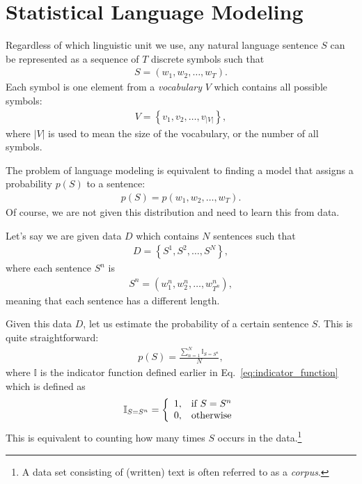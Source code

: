 \documentclass{report}
\newcommand{\II}[0]{\mathbb{I}}
\begin{document}
\section{Statistical Language Modeling}
\label{sec:lm}

Regardless of which linguistic unit we use, any natural language sentence $S$
can be represented as a sequence of $T$ discrete symbols such that
\begin{align*}
    S = (w_1, w_2, \ldots, w_T).
\end{align*}
Each symbol is one element from a {\em vocabulary} $V$ which contains all
possible symbols:
\begin{align*}
    V = \left\{ v_1, v_2, \ldots, v_{|V|}\right\},
\end{align*}
where $|V|$ is used to mean the size of the vocabulary, or the number of all
symbols.

The problem of language modeling is equivalent to finding a model that assigns a
probability $p(S)$ to a sentence:
\begin{align}
    \label{eq:sentence_prob}
    p(S) = p(w_1, w_2, \ldots, w_T).
\end{align}
Of course, we are not given this distribution and need to learn this from data.

Let's say we are given data $D$ which contains $N$ sentences such that
\begin{align*}
    D = \left\{ S^1, S^2, \ldots, S^N \right\},
\end{align*}
where each sentence $S^n$ is 
\begin{align*}
    S^n = (w_1^n, w_2^n, \ldots, w_{T^n}^n),
\end{align*}
meaning that each sentence has a different length.

Given this data $D$, let us estimate the probability of a certain sentence $S$.
This is quite straightforward:
\begin{align}
    \label{eq:sentence_mle}
    p(S) = \frac{\sum_{n=1}^N \II_{S = S^n}}{N},
\end{align}
where $\II$ is the indicator function defined earlier in
Eq.~\eqref{eq:indicator_function} which is defined as
\begin{align*}
    \II_{S=S^n} = \left\{ 
        \begin{array}{c c}
            1, & \text{if }S=S^n \\
            0, & \text{otherwise}
        \end{array}
        \right.
\end{align*}
This is equivalent to counting how many times $S$ occurs in the data.\footnote{
    A data set consisting of (written) text is often referred to as a {\em
    corpus}. 
}
\end{document}
